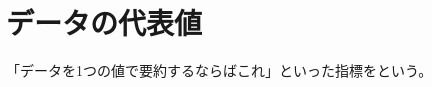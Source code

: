 \documentclass[../../topic_probability-statistics]{subfiles}
\begin{document}
\chapter{データの代表値}

「データを1つの値で要約するならばこれ」といった指標をという。



\end{document}
